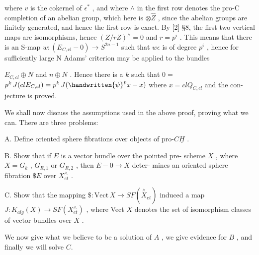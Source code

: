 
where  $v$  is the cokernel of  $\epsilon^*$ , and where  $\wedge$  in the first row
denotes the pro-C completion of an abelian group, which here is  $\otimes\hat{Z}$ ,
since the abelian groups are finitely generated, and hence the first
row is exact.  By [2] §8, the first two vertical maps are isomorphisms,
hence  $(Z/rZ)^{\wedge} = 0$  and  $r = p^{i}$ .  This means that there is an S-map
$w:(E_{C,\mathrm{cl}} - 0) \to S^{2n-1}$  such that  $w\epsilon$  is of degree $p^{i}$ , hence for
sufficiently large  N  Adams' criterion may be applied to the bundles



$E_{C,cl} \oplus N$ and $n \oplus N$ . Hence there is a $k$ such that $0 =$
$p^{k}\, J(clE_{C,cl}) = p^{k}\, J(\handwritten{\psi}^{p}x - x)$ where $x = clQ_{C,cl}$ and the con-%
jecture is proved.

We shall now discuss the assumptions used in the above proof,
proving what we can. There are three problems:

A. Define oriented sphere fibrations over objects of pro-$C\underline{H}$ .

B. Show that if $E$ is a vector bundle over the pointed pre-%
scheme $X$ , where $X = G_{k}$ , $G_{R,1}$ or $G_{R,2}$ , then $E - 0 \to X$ deter-%
mines an oriented sphere fibration $\$E$ over $X^{\wedge}_{et}$ .

C. Show that the mapping $\${:}\mathrm{Vect}\,X \to SF(\overset{\wedge}{X}_{et})$ induced a map
$J{:}K_{alg}(X) \to SF(X^{\wedge}_{et})$ , where Vect $X$ denotes the set of isomorphism
classes of vector bundles over $X$ .

We now give what we believe to be a solution of $A$ , we give
evidence for $B$ , and finally we will solve $C$.

